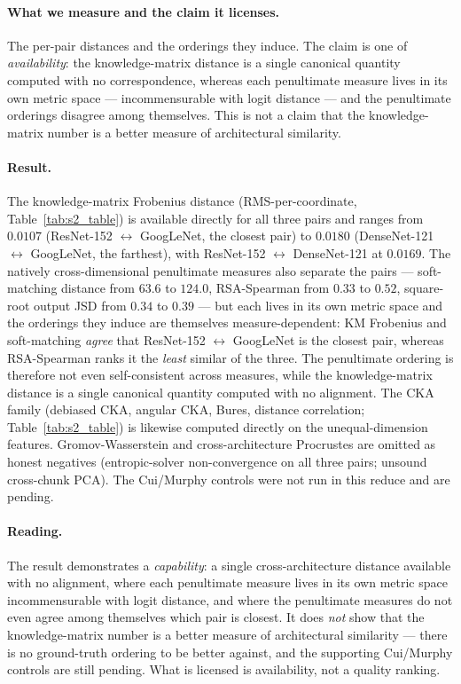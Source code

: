 \paragraph{What we measure and the claim it licenses.}
The per-pair distances and the orderings they induce. The claim is one of
\emph{availability}: the knowledge-matrix distance is a single canonical
quantity computed with no correspondence, whereas each penultimate measure
lives in its own metric space --- incommensurable with logit distance ---
and the penultimate orderings disagree among themselves. This is not
a claim that the knowledge-matrix number is a better measure of
architectural similarity.

\paragraph{Result.}


The knowledge-matrix Frobenius distance (RMS-per-coordinate,
Table~\ref{tab:s2_table}) is available directly for all three pairs and
ranges from $0.0107$ (ResNet-152 $\leftrightarrow$ GoogLeNet, the closest
pair) to $0.0180$ (DenseNet-121 $\leftrightarrow$ GoogLeNet, the farthest),
with ResNet-152 $\leftrightarrow$ DenseNet-121 at $0.0169$. The natively
cross-dimensional penultimate measures also separate the pairs ---
soft-matching distance from $63.6$ to $124.0$, RSA-Spearman from $0.33$ to
$0.52$, square-root output JSD from $0.34$ to $0.39$ --- but each lives in
its own metric space and the orderings they induce are themselves
measure-dependent: KM Frobenius and soft-matching \emph{agree} that
ResNet-152 $\leftrightarrow$ GoogLeNet is the closest pair, whereas
RSA-Spearman ranks it the \emph{least} similar of the three. The
penultimate ordering is therefore not even self-consistent across
measures, while the knowledge-matrix distance is a single canonical
quantity computed with no alignment.
The CKA family (debiased CKA, angular CKA, Bures, distance correlation;
Table~\ref{tab:s2_table}) is likewise computed directly on the
unequal-dimension features. Gromov-Wasserstein and cross-architecture
Procrustes are omitted as honest negatives (entropic-solver non-convergence
on all three pairs; unsound cross-chunk PCA). The Cui/Murphy controls were
not run in this reduce and are pending.

\paragraph{Reading.}
The result demonstrates a \emph{capability}: a single cross-architecture
distance available with no alignment, where each penultimate measure lives
in its own metric space incommensurable with logit distance, and where the
penultimate measures do not even agree among themselves which pair is
closest. It does \emph{not} show that the knowledge-matrix number is a
better measure of architectural similarity --- there is no ground-truth
ordering to be better against, and the supporting Cui/Murphy controls are
still pending. What is licensed is availability, not a quality ranking.


